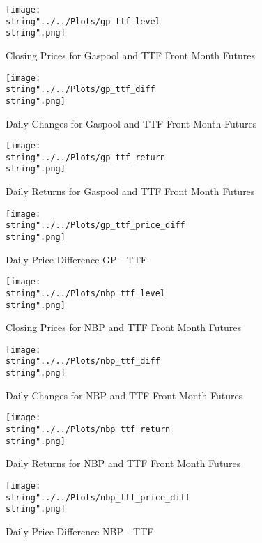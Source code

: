 \begin{figure}
  \centering
\texttt{[image: \\string"../../Plots/gp\_ttf\_level\\string".png]}
  \caption{Closing Prices for Gaspool and TTF Front Month Futures}\label{fig:gp_ttf_level}
\end{figure}

\begin{figure}
  \centering
\texttt{[image: \\string"../../Plots/gp\_ttf\_diff\\string".png]}
  \caption{Daily Changes for Gaspool and TTF Front Month Futures}\label{fig:gp_ttf_diff}
\end{figure}

\begin{figure}
  \centering
\texttt{[image: \\string"../../Plots/gp\_ttf\_return\\string".png]}
  \caption{Daily Returns for Gaspool and TTF Front Month Futures}\label{fig:gp_ttf_return}
\end{figure}

\begin{figure}
  \centering
\texttt{[image: \\string"../../Plots/gp\_ttf\_price\_diff\\string".png]}
  \caption{Daily Price Difference GP - TTF}\label{fig:gp_ttf_price_diff}
\end{figure}


\begin{figure}
  \centering
\texttt{[image: \\string"../../Plots/nbp\_ttf\_level\\string".png]}
  \caption{Closing Prices for NBP and TTF Front Month Futures}\label{fig:nbp_ttf_level}
\end{figure}

\begin{figure}
  \centering
\texttt{[image: \\string"../../Plots/nbp\_ttf\_diff\\string".png]}
  \caption{Daily Changes for NBP and TTF Front Month Futures}\label{fig:nbp_ttf_diff}
\end{figure}

\begin{figure}
  \centering
\texttt{[image: \\string"../../Plots/nbp\_ttf\_return\\string".png]}
  \caption{Daily Returns for NBP and TTF Front Month Futures}\label{fig:nbp_ttf_return}
\end{figure}

\begin{figure}
  \centering
\texttt{[image: \\string"../../Plots/nbp\_ttf\_price\_diff\\string".png]}
  \caption{Daily Price Difference NBP - TTF}\label{fig:nbp_ttf_price_diff}
\end{figure}

